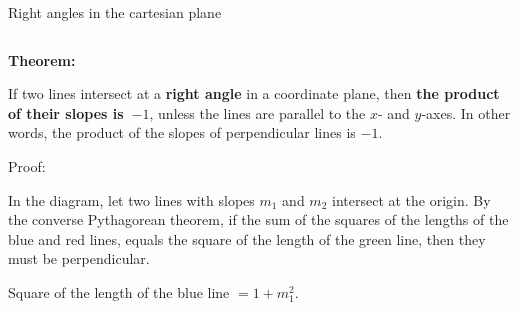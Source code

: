 \documentclass[9pt,aspectratio=169]{beamer}
\begin{document}
\begin{frame}{Right angles in the cartesian plane}
  \begin{columns}[T]
    \begin{column}{0.5\textwidth}
      \begin{definition}
        \textbf{Theorem:}
        
        If two lines intersect at a \textbf{right angle} in a coordinate plane, then \textbf{the product of their slopes is~$-1$}, unless the lines are parallel to the $x$- and $y$-axes.  In other words, the product of the slopes of perpendicular lines is $-1$.
      \end{definition}

      \begin{wrapfigure}{l}{0.4\textwidth}
        \vspace*{-1em}
        \vspace*{-1em}
      \end{wrapfigure}

      Proof: 
      
      In the diagram, let two lines with slopes $m_1$ and $m_2$ intersect at the origin.  By the converse Pythagorean theorem, if the sum of the squares of the lengths of the blue and red lines, equals the square of the length of the green line, then they must be perpendicular.

      Square of the length of the blue line $= 1 + m_1^2$.
      

\end{column}
\end{columns}
\end{frame}
\end{document}
